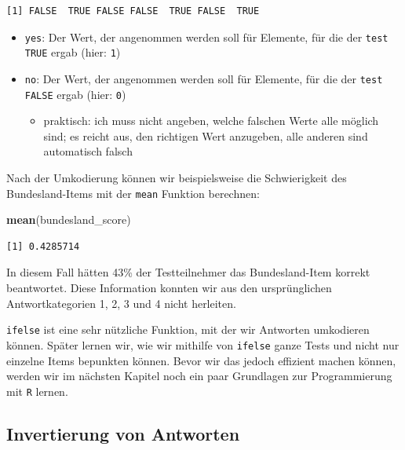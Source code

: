 \documentclass[12pt,]{tufte-book}
\newenvironment{Shaded}{\begin{snugshade}}{\end{snugshade}}
\newcommand{\KeywordTok}[1]{\textcolor[rgb]{0.13,0.29,0.53}{\textbf{#1}}}
\newcommand{\NormalTok}[1]{#1}
\providecommand{\tightlist}{%
  \setlength{\itemsep}{0pt}\setlength{\parskip}{0pt}}
\theoremstyle{definition}
\theoremstyle{definition}
\theoremstyle{definition}
\theoremstyle{remark}
\begin{document}
\begin{verbatim}
[1] FALSE  TRUE FALSE FALSE  TRUE FALSE  TRUE
\end{verbatim}

\begin{itemize}
\tightlist
\item
  \texttt{yes}: Der Wert, der angenommen werden soll für Elemente, für
  die der \texttt{test} \texttt{TRUE} ergab (hier: \texttt{1})
\item
  \texttt{no}: Der Wert, der angenommen werden soll für Elemente, für
  die der \texttt{test} \texttt{FALSE} ergab (hier: \texttt{0})

  \begin{itemize}
  \tightlist
  \item
    praktisch: ich muss nicht angeben, welche falschen Werte alle
    möglich sind; es reicht aus, den richtigen Wert anzugeben, alle
    anderen sind automatisch falsch
  \end{itemize}
\end{itemize}

Nach der Umkodierung können wir beispielsweise die Schwierigkeit des
Bundesland-Items mit der \texttt{mean} Funktion berechnen:

\begin{Shaded}
\begin{Highlighting}[]
\KeywordTok{mean}\NormalTok{(bundesland_score)}
\end{Highlighting}
\end{Shaded}

\begin{verbatim}
[1] 0.4285714
\end{verbatim}

In diesem Fall hätten 43\% der Testteilnehmer das Bundesland-Item
korrekt beantwortet. Diese Information konnten wir aus den
ursprünglichen Antwortkategorien 1, 2, 3 und 4 nicht herleiten.

\texttt{ifelse} ist eine sehr nützliche Funktion, mit der wir Antworten
umkodieren können. Später lernen wir, wie wir mithilfe von
\texttt{ifelse} ganze Tests und nicht nur einzelne Items bepunkten
können. Bevor wir das jedoch effizient machen können, werden wir im
nächsten Kapitel noch ein paar Grundlagen zur Programmierung mit
\texttt{R} lernen.

\subsection{Invertierung von
Antworten}\label{invertierung-von-antworten}
\end{document}
